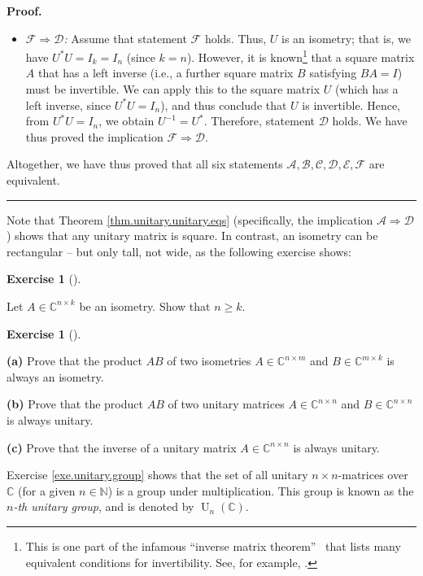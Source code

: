 \documentclass[numbers=enddot,12pt,final,onecolumn,notitlepage]{scrartcl}%
\newcounter{exer}
\numberwithin{exer}{subsection}
\theoremstyle{definition}
\newtheorem{exmp}[exer]{Exercise}
\newenvironment{exercise}[1][]
{\begin{exmp}[#1]\begin{leftbar}}
{\end{leftbar}\end{exmp}}
\newenvironment{proof}[1][Proof]{\noindent\textbf{#1.} }{\ \rule{0.5em}{0.5em}}
\begin{document}
\begin{proof}
\begin{itemize}
\item $\mathcal{F}\Longrightarrow\mathcal{D}$\textit{:} Assume that statement
$\mathcal{F}$ holds. Thus, $U$ is an isometry; that is, we have $U^{\ast
}U=I_{k}=I_{n}$ (since $k=n$). However, it is known\footnote{This is one part
of the infamous \textquotedblleft inverse matrix theorem\textquotedblright%
\ that lists many equivalent conditions for invertibility. See, for example,
\cite[Chapter 2, Proposition 3.8]{Treil15}.} that a square matrix $A$ that has
a left inverse (i.e., a further square matrix $B$ satisfying $BA=I$) must be
invertible. We can apply this to the square matrix $U$ (which has a left
inverse, since $U^{\ast}U=I_{n}$), and thus conclude that $U$ is invertible.
Hence, from $U^{\ast}U=I_{n}$, we obtain $U^{-1}=U^{\ast}$. Therefore,
statement $\mathcal{D}$ holds. We have thus proved the implication
$\mathcal{F}\Longrightarrow\mathcal{D}$.
\end{itemize}

Altogether, we have thus proved that all six statements $\mathcal{A}%
,\mathcal{B},\mathcal{C},\mathcal{D},\mathcal{E},\mathcal{F}$ are equivalent.
\end{proof}

Note that Theorem \ref{thm.unitary.unitary.eqs} (specifically, the implication
$\mathcal{A}\Longrightarrow\mathcal{D}$) shows that any unitary matrix is
square. In contrast, an isometry can be rectangular -- but only tall, not
wide, as the following exercise shows:

\begin{exercise}
\label{exe.unitary.isometry-tall} Let $A\in\mathbb{C}^{n\times k}$ be
an isometry. Show that $n\geq k$.
\end{exercise}

\begin{exercise}
\label{exe.unitary.group} \textbf{(a)} Prove that the product $AB$ of
two isometries $A\in\mathbb{C}^{n\times m}$ and $B\in\mathbb{C}^{m\times k}$
is always an isometry.

\textbf{(b)} Prove that the product $AB$ of two unitary matrices
$A\in\mathbb{C}^{n\times n}$ and $B\in\mathbb{C}^{n\times n}$ is always unitary.

\textbf{(c)} Prove that the inverse of a unitary matrix $A\in\mathbb{C}%
^{n\times n}$ is always unitary.
\end{exercise}

Exercise \ref{exe.unitary.group} shows that the set of all unitary $n\times
n$-matrices over $\mathbb{C}$ (for a given $n\in\mathbb{N}$) is a group under
multiplication. This group is known as the $n$\emph{-th unitary group}, and is
denoted by $\operatorname*{U}\nolimits_{n}\left(  \mathbb{C}\right)  $.
\end{document}
